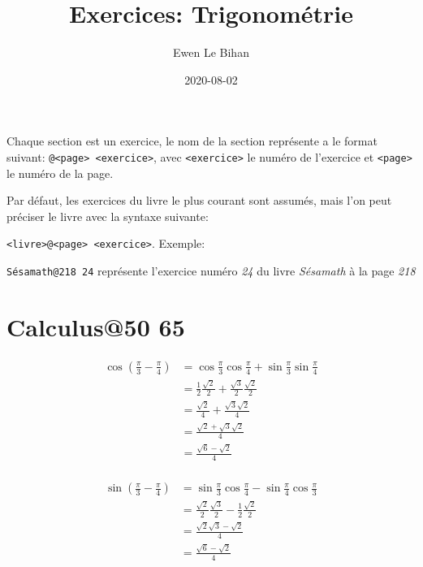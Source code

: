 \documentclass{article}
\title{Exercices: Trigonométrie}
\author{Ewen Le Bihan}
\date{2020-08-02}
\begin{document}
\maketitle

\abstract{}
Chaque section est un exercice, le nom de la section représente a le format suivant:
\texttt{@<page> <exercice>}, avec \texttt{<exercice>} le numéro de l'exercice et \texttt{<page>} le numéro de la page.

Par défaut, les exercices du livre le plus courant sont assumés, mais l'on peut préciser le livre avec la syntaxe suivante:

\texttt{<livre>@<page> <exercice>}.
Exemple:

\texttt{Sésamath@218 24} représente l'exercice numéro \emph{24} du livre \emph{Sésamath} à la page \emph{218}

\section*{}

\section{Calculus@50 65} %
\begin{align*}
	\cos\left( \frac{\pi}{3} - \frac{\pi}{4} \right) &= \cos\frac{\pi}{3} \cos\frac{\pi}{4} + \sin\frac{\pi}{3} \sin\frac{\pi}{4} \\
							 &= \frac{1}{2} \frac{\sqrt{2} }{2} + \frac{\sqrt{3} }{2} \frac{\sqrt{2} }{2} \\
							 &= \frac{\sqrt{2} }{4} + \frac{\sqrt{3} \sqrt{2} }{4} \\
							 &= \frac{\sqrt{2} + \sqrt{3} \sqrt{2} }{4} \\
							 &= \frac{\sqrt{6} - \sqrt{2} }{4} \\
\end{align*}

\begin{align*}
	\sin\left( \frac{\pi}{3}-\frac{\pi}{4} \right) &= \sin\frac{\pi}{3}\cos\frac{\pi}{4}-\sin\frac{\pi}{4}\cos\frac{\pi}{3} \\
	&= \frac{\sqrt{2} }{2} \frac{\sqrt{3} }{2} - \frac{1}{2}\frac{\sqrt{2} }{2} \\
	&= \frac{\sqrt{2} \sqrt{3} - \sqrt{2} }{4} \\
	&= \frac{\sqrt{6} -\sqrt{2} }{4} \\
\end{align*}
\end{document}
